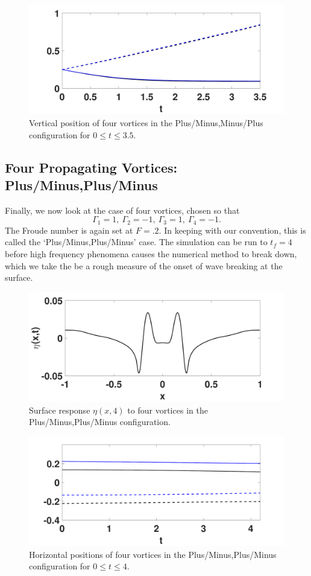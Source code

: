 \documentclass[a4paper,11pt]{article}
\begin{document}
\begin{figure}[!h]
\centering
\includegraphics[width=.75\textwidth]{ztrack_mu_pt2_F_pt2_tf_3pt5_pmmp}
\caption{Vertical position of four vortices in the Plus/Minus,Minus/Plus configuration for $0\leq t \leq 3.5$.}
\label{fig:ztrackpmmp}
\end{figure}

\subsection*{Four Propagating Vortices: Plus/Minus,Plus/Minus}
Finally, we now look at the case of four vortices, chosen so that
\[
\Gamma_{1}=1,~\Gamma_{2}=-1, ~ \Gamma_{3}=1,~\Gamma_{4}=-1.
\]
The Froude number is again set at $F=.2$.  In keeping with our convention, this is called the `Plus/Minus,Plus/Minus' case.  The simulation can be run to $t_{f}=4$ before high frequency phenomena causes the numerical method to break down, which we take the be a rough measure of the onset of wave breaking at the surface.  
\begin{figure}[!h]
\centering
\includegraphics[width=.75\textwidth]{surf_resp_mu_pt2_F_pt2_tf_4pt2_pmpm}
\caption{Surface response $\eta(x,4)$ to four vortices in the Plus/Minus,Plus/Minus configuration.}
\label{fig:surfreppmpm}
\end{figure}
\begin{figure}[!h]
\centering
\includegraphics[width=.75\textwidth]{xtrack_mu_pt2_F_pt2_tf_4pt2_pmpm}
\caption{Horizontal positions of four vortices in the Plus/Minus,Plus/Minus configuration for $0\leq t \leq 4$.}
\end{figure}
\end{document}
